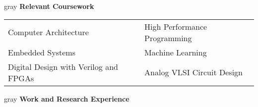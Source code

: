 \documentclass[10.5pt,letterpaper]{article}
\newcommand{\vertspace}{\vspace{1.2mm}}
\newcommand{\tablewidth}{.9\linewidth}
\begin{document}
	\vertspace
	\noindent	
	\begin{heading}{gray}
		\textbf{Relevant Coursework}
	\end{heading}
		\begin{tabular*}{\tablewidth}{@{\extracolsep{\fill}}ll}
			Computer Architecture & High Performance Programming \\
			Embedded Systems      & Machine Learning \\
			Digital Design with Verilog and FPGAs & Analog VLSI Circuit Design \\
		\end{tabular*}
		
	\fi
			
	\vertspace
	\noindent
	\begin{heading}{gray}
		\textbf{Work and Research Experience} 
	\end{heading}
\end{document}

